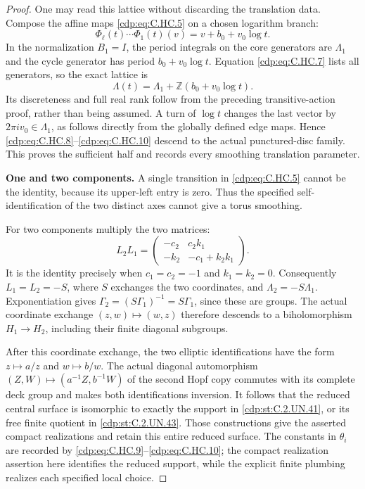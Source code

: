 \begin{proof}
One may read this lattice without discarding
the translation data. Compose the affine
maps \eqref{cdp:eq:C.HC.5} on a chosen logarithm branch:
\[
                    \Phi_\ell(t)\cdots\Phi_1(t)(v)
                          =v+b_0+v_0\log t.
\tag{C.HC.9}\label{cdp:eq:C.HC.9}
\]
In the normalization $B_1=I$, the period
integrals on the core generators are
$\Lambda_1$ and the cycle generator has
period $b_0+v_0\log t$. Equation \eqref{cdp:eq:C.HC.7}
lists all generators, so the exact lattice is
\[
                 \Lambda(t)=
                    \Lambda_1+\mathbb Z(b_0+v_0\log t).
\tag{C.HC.10}\label{cdp:eq:C.HC.10}
\]
Its discreteness and full real rank follow
from the preceding transitive-action proof,
rather than being assumed. A turn of $\log t$
changes the last vector by $2\pi i v_0\in\Lambda_1$,
as follows directly from the globally defined
edge maps. Hence \eqref{cdp:eq:C.HC.8}--\eqref{cdp:eq:C.HC.10} descend
to the actual punctured-disc family. This proves
the sufficient half and records every smoothing
translation parameter.

\par\medskip\noindent\textbf{One and two components.}
A single transition in \eqref{cdp:eq:C.HC.5} cannot be the
identity, because its upper-left entry is zero.
Thus the specified self-identification of the
two distinct axes cannot give a torus smoothing.

For two components multiply the two matrices:
\[
 L_2L_1=
 \begin{pmatrix}
   -c_2&c_2k_1\\
   -k_2&-c_1+k_2k_1
 \end{pmatrix}.
\tag{C.HC.11}\label{cdp:eq:C.HC.11}
\]
It is the identity precisely when
$c_1=c_2=-1$ and $k_1=k_2=0$.
Consequently $L_1=L_2=-S$, where $S$ exchanges
the two coordinates, and
$\Lambda_2=-S\Lambda_1$.
Exponentiation gives
$\Gamma_2=(S\Gamma_1)^{-1}=S\Gamma_1$,
since these are groups. The actual coordinate
exchange $(z,w)\mapsto(w,z)$ therefore descends
to a biholomorphism $H_1\to H_2$, including
their finite diagonal subgroups.

After this coordinate exchange, the two
elliptic identifications have the form
$z\mapsto a/z$ and $w\mapsto b/w$.
The actual diagonal automorphism
$(Z,W)\mapsto(a^{-1}Z,b^{-1}W)$ of the second
Hopf copy commutes with its complete deck group
and makes both identifications inversion.
It follows that the reduced central surface
is isomorphic to exactly the support in
\ref{cdp:st:C.2.UN.41}, or its free finite quotient in
\ref{cdp:st:C.2.UN.43}. Those constructions give the asserted
compact realizations and retain this entire
reduced surface. The constants in $\theta_i$
are recorded by \eqref{cdp:eq:C.HC.9}--\eqref{cdp:eq:C.HC.10}; the
compact realization assertion here identifies
the reduced support, while the explicit finite
plumbing realizes each specified local choice.
\end{proof}


